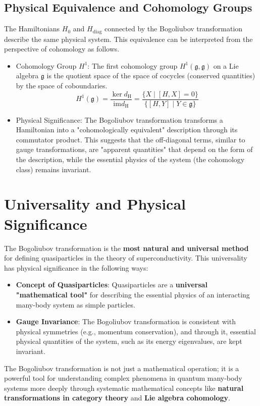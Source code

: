 \documentclass[uplatex,a4j,12pt,dvipdfmx]{article}
\begin{document}
\subsection{Physical Equivalence and Cohomology Groups}

The Hamiltonians $H_{\text{0}}$ and $H_{\text{diag}}$ connected by the Bogoliubov transformation describe the same physical system. This equivalence can be interpreted from the perspective of cohomology as follows.

\begin{itemize}
    \item Cohomology Group $H^1$: The first cohomology group $H^1(\mathfrak{g}, \mathfrak{g})$ on a Lie algebra $\mathfrak{g}$ is the quotient space of the space of cocycles (conserved quantities) by the space of coboundaries.
    \[
    H^1(\mathfrak{g}) = \frac{\ker d_{\text{H}}}{\mathrm{im} d_{\text{H}}} = \frac{\{X \mid [H, X] = 0\}}{\{[H, Y] \mid Y \in \mathfrak{g}\}}
    \]
    \item Physical Significance: The Bogoliubov transformation transforms a Hamiltonian into a "cohomologically equivalent" description through its commutator product. This suggests that the off-diagonal terms, similar to gauge transformations, are "apparent quantities" that depend on the form of the description, while the essential physics of the system (the cohomology class) remains invariant.
\end{itemize}

\section{Universality and Physical Significance}

The Bogoliubov transformation is the \textbf{most natural and universal method} for defining quasiparticles in the theory of superconductivity. This universality has physical significance in the following ways:

\begin{itemize}
    \item \textbf{Concept of Quasiparticles}: Quasiparticles are a \textbf{universal "mathematical tool"} for describing the essential physics of an interacting many-body system as simple particles.
    \item \textbf{Gauge Invariance}: The Bogoliubov transformation is consistent with physical symmetries (e.g., momentum conservation), and through it, essential physical quantities of the system, such as its energy eigenvalues, are kept invariant.
\end{itemize}
The Bogoliubov transformation is not just a mathematical operation; it is a powerful tool for understanding complex phenomena in quantum many-body systems more deeply through systematic mathematical concepts like \textbf{natural transformations in category theory} and \textbf{Lie algebra cohomology}.
\end{document}
